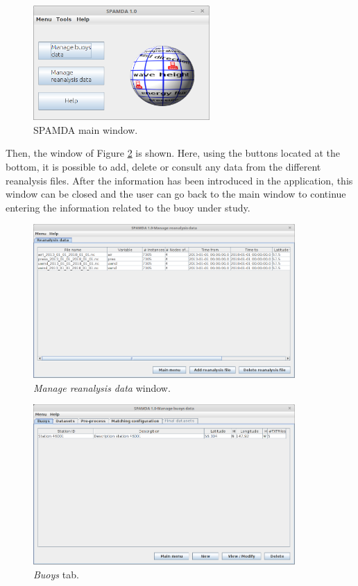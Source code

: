 \documentclass[energies,article,submit,moreauthors,pdftex]{Definitions/mdpi}
\begin{document}
		\begin{figure}[H]
			\centering
			\includegraphics[width=0.60\textwidth]{figures/FigureMain_view.png}
			\caption{SPAMDA main window.}\label{fig:main_view}
		\end{figure}
		
		Then, the window of Figure \ref{fig:reanalysis} is shown. Here, using the buttons located at the bottom, it is possible to add, delete or consult any data from the different reanalysis files. After the information has been introduced in the application, this window can be closed and the user can go back to the main window to continue entering the information related to the buoy under study. 
		
		\begin{figure}[H]
			\centering
			\includegraphics[width=0.89\textwidth]{figures/FigureManage_reanalysis_data.png}
			\caption{\textit{Manage reanalysis data} window.}\label{fig:reanalysis}
		\end{figure}
		
		\begin{figure}[H]
			\centering
			\includegraphics[width=0.89\textwidth]{figures/FigureManage_buoys.png}
			\caption{\textit{Buoys} tab.}\label{fig:manage_buoys}
		\end{figure}
		
\end{document}
